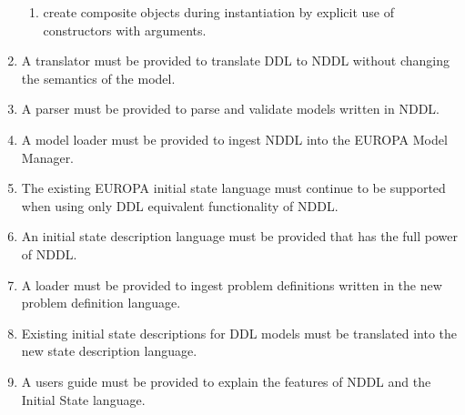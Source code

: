 \documentclass[twoside, 11pt]{article}
\begin{document}
\begin{enumerate}
\begin{enumerate}
\item create composite objects during instantiation by explicit use of constructors with arguments.
\end{enumerate}
\item A translator must be provided to translate DDL to NDDL without changing the semantics of the model.
\item A parser must be provided to parse and validate models written in NDDL.
\item A model loader must be provided to ingest NDDL into the EUROPA Model Manager.
\item The existing EUROPA initial state language must continue to be supported when using only DDL equivalent functionality of NDDL.
\item An initial state description language must be provided that has the full power of NDDL.
\item A loader must be provided to ingest problem definitions written in the new problem definition language.
\item Existing initial state descriptions for DDL models must be translated into the new state description language.
\item A users guide must be provided to explain the features of NDDL and the Initial State language.
\end{enumerate}
\end{document}
